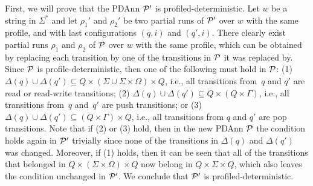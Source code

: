 First, we will prove that the PDAnn $\mathcal{P}'$ is profiled-deterministic. Let $w$ be a string in $\Sigma^*$ and let $\rho_1'$ and $\rho_2'$ be two partial runs of $\mathcal{P}'$ over $w$ with the same profile, and with last configurations $(q, i)$ and $(q', i)$. There clearly exist partial runs $\rho_1$ and $\rho_2$ of $\mathcal{P}$ over $w$ with the same profile, which can be obtained by replacing each transition by one of the transitions in $\mathcal{P}$ it was replaced by. Since $\mathcal{P}$ is profile-deterministic, then one of the following must hold in $\mathcal{P}$: (1) $\Delta(q) \cup \Delta(q') \subseteq Q \times (\Sigma \cup \Sigma \times
\Omega) \times Q$, i.e., all transitions from~$q$ and $q'$ are read or
read-write transitions; (2) $\Delta(q) \cup \Delta(q') \subseteq Q \times (Q \times \Gamma)$, i.e.,
all transitions from~$q$ and~$q'$ are push transitions; or (3) $\Delta(q) \cup \Delta(q') \subseteq (Q \times \Gamma) \times Q$, i.e., 
all transitions from $q$ and $q'$ are pop transitions. Note that if (2) or (3) hold, then in the new PDAnn $\mathcal{P}$ the condition holds again in $\mathcal{P}'$ trivially since none of the transitions in $\Delta(q)$ and $\Delta(q')$ was changed. Moreover, if (1) holds, then it can be seen that all of the transitions that belonged in $Q\times (\Sigma\times\Omega)\times Q$ now belong in $Q\times \Sigma\times Q$, which also leaves the condition unchanged in $\mathcal{P}'$. We conclude that $\mathcal{P}'$ is profiled-deterministic.

